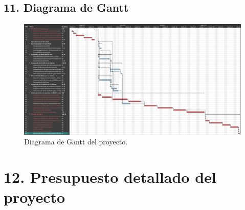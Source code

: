 \documentclass[
11pt, %
codirector, %
]{charter}
\begin{document}
\begin{landscape}
\section{11. Diagrama de Gantt}
\label{sec:gantt}
\begin{figure}[htpb]
\centering 
\includegraphics[height=.7\textheight]{./Figuras/Gantt_v2.png}
\caption{Diagrama de Gantt del proyecto.}
\label{fig:diagGantt}
\end{figure}
\end{landscape}


\section{12. Presupuesto detallado del proyecto}
\label{sec:presupuesto}



\end{document}
